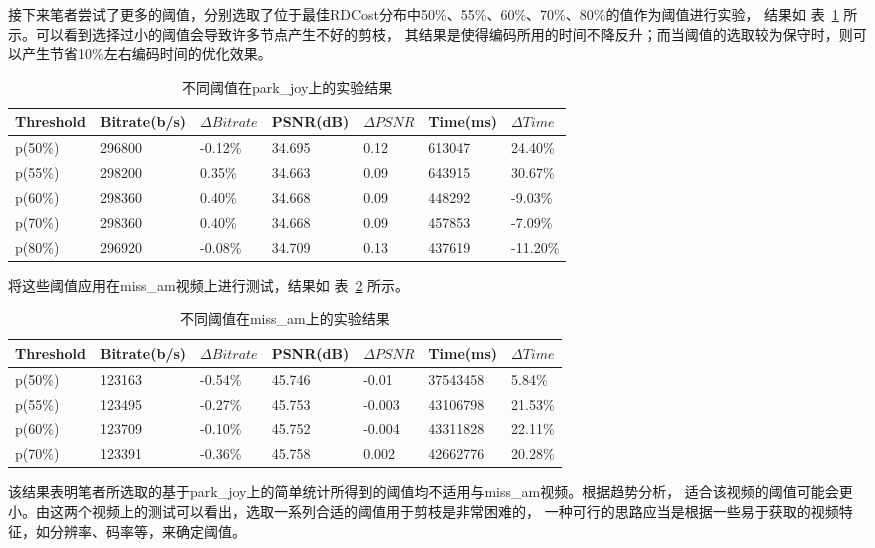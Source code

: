 接下来笔者尝试了更多的阈值，分别选取了位于最佳RDCost分布中50\%、55\%、60\%、70\%、80\%的值作为阈值进行实验，
结果如 表~\ref{tab:result-more-threshold-park} 所示。可以看到选择过小的阈值会导致许多节点产生不好的剪枝，
其结果是使得编码所用的时间不降反升；而当阈值的选取较为保守时，则可以产生节省10\%左右编码时间的优化效果。

\begin{table}[H]
  \centering
    \caption{不同阈值在park\_joy上的实验结果}
    \label{tab:result-more-threshold-park}
    \begin{tabularx}{\linewidth}{XXXXXXX}
      \toprule[1.5pt]
      Threshold & Bitrate(b/s) & $\Delta Bitrate$ & PSNR(dB) & $\Delta PSNR$ & Time(ms) & $\Delta Time$ \\
      \midrule[1pt]
      p(50\%) & 296800 & -0.12\% & 34.695 & 0.12 & 613047 & 24.40\% \\
      p(55\%) & 298200 & 0.35\% & 34.663 & 0.09 & 643915 & 30.67\% \\
      p(60\%) & 298360 & 0.40\% & 34.668 & 0.09 & 448292 & -9.03\% \\
      p(70\%) & 298360 & 0.40\% & 34.668 & 0.09 & 457853 & -7.09\% \\
      p(80\%) & 296920 & -0.08\% & 34.709 & 0.13 & 437619 & -11.20\% \\
      \bottomrule[1.5pt]
    \end{tabularx}
\end{table}


将这些阈值应用在miss\_am视频上进行测试，结果如 表~\ref{tab:result-more-threshold-miss} 所示。


\begin{table}[H]
  \centering
    \caption{不同阈值在miss\_am上的实验结果}
    \label{tab:result-more-threshold-miss}
    \begin{tabularx}{\linewidth}{XXXXXXX}
      \toprule[1.5pt]
      Threshold & Bitrate(b/s) & $\Delta Bitrate$ & PSNR(dB) & $\Delta PSNR$ & Time(ms) & $\Delta Time$ \\
      \midrule[1pt]
      p(50\%) & 123163 & -0.54\% & 45.746 & -0.01 & 37543458 & 5.84\% \\
      p(55\%) & 123495 & -0.27\% & 45.753 & -0.003 & 43106798 & 21.53\% \\
      p(60\%) & 123709 & -0.10\% & 45.752 & -0.004 & 43311828 & 22.11\% \\
      p(70\%) & 123391 & -0.36\% & 45.758  & 0.002 & 42662776 & 20.28\% \\
      \bottomrule[1.5pt]
    \end{tabularx}
\end{table}

该结果表明笔者所选取的基于park\_joy上的简单统计所得到的阈值均不适用与miss\_am视频。根据趋势分析，
适合该视频的阈值可能会更小。由这两个视频上的测试可以看出，选取一系列合适的阈值用于剪枝是非常困难的，
一种可行的思路应当是根据一些易于获取的视频特征，如分辨率、码率等，来确定阈值。